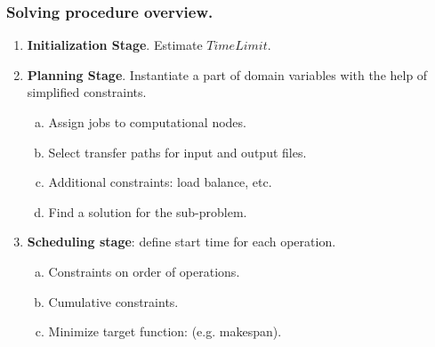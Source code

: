 \documentclass{beamer}
\begin{document}
\begin{frame}\frametitle{Solving procedure overview.}

\begin{enumerate}
\item \textbf{Initialization Stage}. Estimate $TimeLimit$.
\item \textbf{Planning Stage}. Instantiate a part of domain variables with the help of simplified constraints.     
	\begin{enumerate}[a.]
	\item Assign jobs to computational nodes. 
	\item Select transfer paths for input and output files. 
	\item Additional constraints: load balance, etc.
	\item Find a solution for the sub-problem.
	\end{enumerate}
\item \textbf{Scheduling stage}: define start time for each operation. 
	\begin{enumerate} [a.]
	\item Constraints on order of operations. 
	\item Cumulative constraints.
	\item Minimize target function: (e.g. makespan).
	\end{enumerate}
\end{enumerate}
\end{frame}
\end{document}
